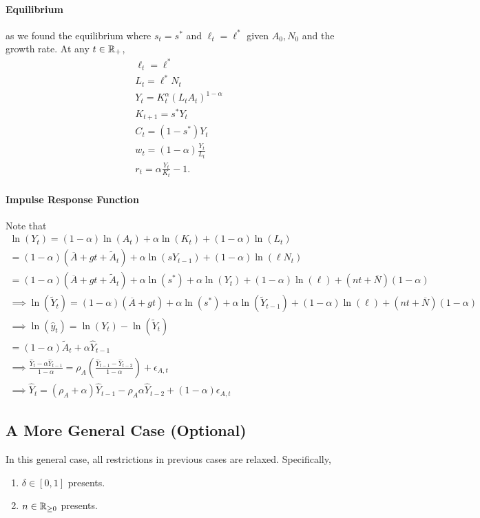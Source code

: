 \documentclass[11pt]{article}
\begin{document}
		\paragraph{Equilibrium} as we found the equilibrium where $s_t = s^*$ and $\ell_t = \ell^*$ given $A_0, N_0$ and the growth rate. At any $t \in \mathbb{R}_+$,
		\begin{gather*}
			\ell_t = \ell^* \\
			L_t = \ell^* N_t \\
			Y_t = K_t^\alpha (L_t A_t) ^{1-\alpha} \\
			K_{t+1} = s^* Y_t \\
			C_t = (1-s^*)Y_t \\
			w_t = (1-\alpha) \frac{Y_t}{L_t} \\
			r_t = \alpha \frac{Y_t}{K_t} - 1.
		\end{gather*}
		
		\paragraph{Impulse Response Function} Note that
		\begin{gather*}
			\ln(Y_t) = (1 - \alpha) \ln(A_t) + \alpha \ln (K_t) + (1-\alpha) \ln (L_t) \\
			= (1 - \alpha) (\overline{A} + gt + \tilde{A}_t) + \alpha \ln(s Y_{t-1}) + (1-\alpha) \ln(\ell N_t) \\
			= (1 - \alpha) (\overline{A} + gt + \tilde{A}_t) + \alpha \ln (s^*) + \alpha \ln(Y_t) + (1-\alpha) \ln (\ell) + (nt + \overline{N})(1-\alpha) \\
			\implies \ln(\tilde{Y}_t) = (1-\alpha) (\overline{A} + gt) + \alpha \ln(s^*) + \alpha \ln(\tilde{Y}_{t-1}) + (1-\alpha) \ln(\ell) + (nt + \overline{N})(1-\alpha) \\
			\implies \ln(\hat{y}_t) = \ln(Y_t) - \ln(\tilde{Y}_t) \\
			= (1-\alpha)\tilde{A}_t + \alpha \hat{Y}_{t-1} \\
			\implies \frac{\hat{Y}_t - \alpha \hat{Y}_{t-1}}{1-\alpha} = \rho_A (\frac{\hat{Y}_{t-1} - \hat{Y}_{t-2}}{1-\alpha}) + \epsilon_{A, t} \\
			\implies \hat{Y}_{t} = (\rho_A + \alpha) \hat{Y}_{t-1} - \rho_A \alpha \hat{Y}_{t-2} + (1 - \alpha)\epsilon_{A,t}
		\end{gather*}
		
		\subsection{A More General Case (Optional)}
			\begin{assumption}
				In this general case, all restrictions in previous cases are relaxed. Specifically,
				\begin{enumerate}
					\item $\delta \in [0, 1]$ presents.
					\item $n \in \mathbb{R}_{\geq 0}$ presents.
				\end{enumerate}
			\end{assumption}
			
\end{document}
